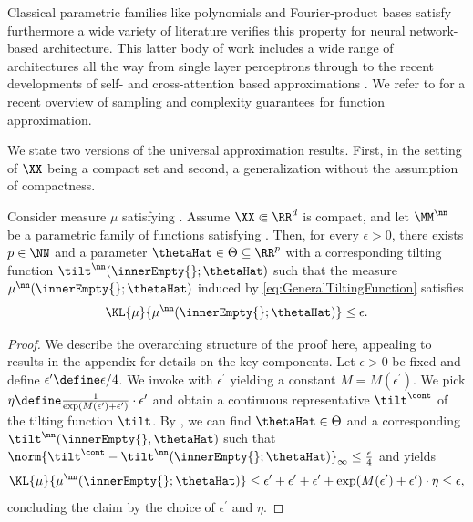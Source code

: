 \documentclass{article}
\begin{document}
Classical parametric families like polynomials and Fourier-product bases
satisfy  
\citep{powell1981approximation,lightApproximationTheoryTensor1985,
cheneyCourseApproximationTheory2009,
trefethenApproximationTheoryApproximation2019}
furthermore a wide variety of literature verifies this property
for neural network-based architecture. This latter body of work includes
a wide range of architectures all the way from single layer
perceptrons \citep{pinkusApproximationTheoryMLP1999} through to the recent
developments of self- and cross-attention based approximations
\citep{liuAttentionMechanismMaxAffine2025a}.
We refer to \citep{kriegApproximationFunctionsOptimal2026} for a
recent overview of sampling and complexity guarantees for function
approximation.

We state two versions of the universal approximation results. First, in the
setting of $\XX$ being a compact set and second, a generalization without
the assumption of compactness.
\begin{theorem}
 \label{result:UniversalApproxJointNetwork}
 Consider measure $\mu$ satisfying .
 Assume $\XX \Subset \RR^{d}$ is compact, and
 let $\MM^\nn$ be a parametric family of functions satisfying
 .
 Then, for every $\epsilon > 0$, there exists $p \in \NN$ and
 a parameter $\thetaHat \in \Theta \subseteq \RR^p$ with a corresponding tilting function
 $\tilt^\nn(\innerEmpty{};\thetaHat)$ such that the measure
 $\mu^\nn(\innerEmpty{};\thetaHat)$ induced by
 \eqref{eq:GeneralTiltingFunction} satisfies
 \begin{align*}
  \KL{\mu}{\mu^\nn(\innerEmpty{};\thetaHat)} \leq \epsilon.
 \end{align*}
\end{theorem}
\begin{proof}
 We describe the overarching structure of the proof here, appealing to results in the
 appendix for details on the key components.
 Let $\epsilon > 0$ be fixed and define $\epsilon^\prime \define \epsilon/4$. We
 invoke  with $\epsilon^\prime$ yielding a constant
 $M = M(\epsilon^\prime)$.
 We pick $\eta \define \frac{1}{\exp(M(\epsilon^\prime) + \epsilon^\prime)}
  \cdot \epsilon^\prime$ and obtain a continuous representative $\tilt^\cont$
 of the tilting function $\tilt$. By ,
 we can find $\thetaHat \in \Theta$ and a corresponding $\tilt^\nn(\innerEmpty{}, \thetaHat)$
 such that
 $\norm{\tilt^\cont - \tilt^\nn(\innerEmpty{};\thetaHat)}_{\infty} \leq \frac{\epsilon}{4}$
 and  yields
 \begin{align*}
  \KL{\mu}{\mu^\nn(\innerEmpty{};\thetaHat)} \leq \epsilon^\prime
  + \epsilon^\prime + \epsilon^\prime +
  \exp(M(\epsilon^\prime) + \epsilon^\prime) \cdot \eta
  \leq \epsilon,
 \end{align*}
 concluding the claim by the choice of $\epsilon^\prime$ and $\eta$.
\end{proof}
\end{document}
